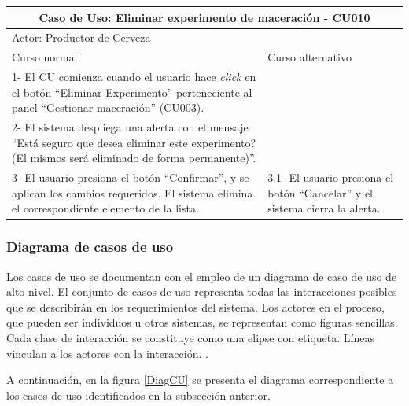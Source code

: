 \begin{longtable}{|p{7cm}|p{7cm}|}
        \hline
        \multicolumn{2}{|c|}{\textbf{Caso de Uso: Eliminar experimento de maceración - CU010}} \\
        \hline
        \multicolumn{2}{|l|}{Actor: Productor de Cerveza} \\
        \hline
        Curso normal & Curso alternativo \\
        \hline
        1- El CU comienza cuando el usuario hace \textit{click} en el botón ``Eliminar Experimento'' perteneciente al panel ``Gestionar maceración'' (CU003). & \\
        \hline
        2- El sistema despliega una alerta con el mensaje ``Está seguro que desea eliminar este experimento? (El mismos será eliminado de forma permanente)''. &
        \\
        \hline
        3- El usuario presiona el botón ``Confirmar'', y se aplican los cambios requeridos. El sistema elimina el correspondiente elemento de la lista. & 3.1- El usuario presiona el botón ``Cancelar'' y el sistema cierra la alerta.
        \\
        \hline

 \end{longtable}
    
      \subsubsection{Diagrama de casos de uso}
      \par
      Los casos de uso se documentan con el empleo de un diagrama de caso de uso de alto nivel. El conjunto de casos de uso representa todas las interacciones posibles que se describirán en los requerimientos del sistema. Los actores en el proceso, que pueden ser individuos u otros sistemas, se representan como figuras sencillas. Cada clase de interacción se constituye como una elipse con etiqueta. Líneas vinculan a los actores con la interacción. \cite{Som05}.
      \par
      A continuación, en la figura \ref{DiagCU} se presenta el diagrama correspondiente a los casos de uso identificados en la subsección anterior.\\
      
